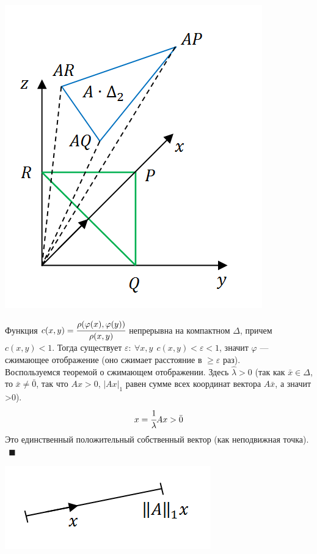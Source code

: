 \documentclass[12pt]{article}
\theoremstyle{definition}
\numberwithin{equation}{section}
\begin{document}
\begin{center}
\includegraphics[scale=0.8]{l15_3.png}\\
\end{center}
Функция $c(x, y)=\cfrac{\rho(\varphi(x), \varphi(y))}{\rho(x, y)}$ непрерывна на компактном $\Delta$, причем $c(x, y)<1$. Тогда существует $\varepsilon:~\forall x, y~~c(x, y)<\varepsilon<1$, значит $\varphi$ --- сжимающее отображение (оно сжимает расстояние в $\geqslant \varepsilon$ раз).\\
Воспользуемся теоремой о сжимающем отображении. Здесь $\hat \lambda>0$ (так как $\bar x\in \Delta$, то $\bar x\neq \bar 0$, так что $Ax>0$, $|Ax|_1$ равен сумме всех координат вектора $A\bar x$, а значит >0).\\
$$x=\cfrac{1}{\lambda}Ax>\bar 0$$
Это единственный положительный собственный вектор (как неподвижная точка).$~~\blacksquare$\\
\begin{center}
\includegraphics[scale=0.8]{l15_4.png}\\
\end{center}
\end{document}

